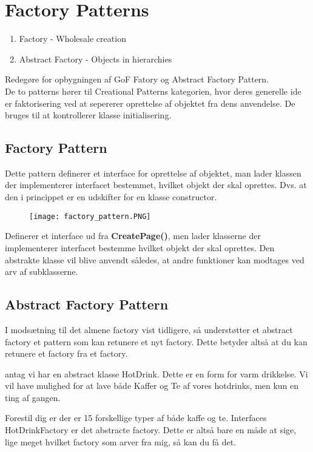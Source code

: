 \documentclass[../SWD_disp.tex]{subfiles}
\begin{document}
\section{Factory Patterns}
\begin{enumerate}
    \item Factory - Wholesale creation
    \item Abstract Factory - Objects in hierarchies
\end{enumerate}

Redegøre for opbygningen af GoF Fatory og Abstract Factory Pattern.
\\

De to patterns hører til Creational Patterns kategorien, hvor deres generelle ide er faktorisering ved at sepererer oprettelse af objektet fra dens anvendelse. De bruges til at kontrollerer klasse initialisering.

\subsection*{Factory Pattern}
Dette pattern definerer et interface for oprettelse af objektet, man lader klassen der implementerer interfacet bestemmet, hvilket objekt der skal oprettes. Dvs. at den i princippet er en udskifter for en klasse constructor.

\begin{figure}[H]
    \centering
    \texttt{[image: factory\_pattern.PNG]}
\end{figure}

Definerer et interface ud fra \textbf{CreatePage()}, men lader klasserne der implementerer interfacet bestemme hvilket objekt der skal oprettes. Den abstrakte klasse vil blive anvendt således, at andre funktioner kan modtages ved arv af subklasserne.

\subsection*{Abstract Factory Pattern}
I modsætning til det almene factory vist tidligere, så understøtter et abstract factory et pattern som kan retunere et nyt factory. Dette betyder altså at du kan retunere et factory fra et factory. 

antag vi har en abstract klasse HotDrink. Dette er en form for varm drikkelse. Vi vil have mulighed for at lave både Kaffer og Te af vores hotdrinks, men kun en ting af gangen. 

Forestil dig er der er 15 forskellige typer af både kaffe og te. Interfaces HotDrinkFactory er det abstracte factory. Dette er altså bare en måde at sige, lige meget hvilket factory som arver fra mig, så kan du få det. 
\end{document}
